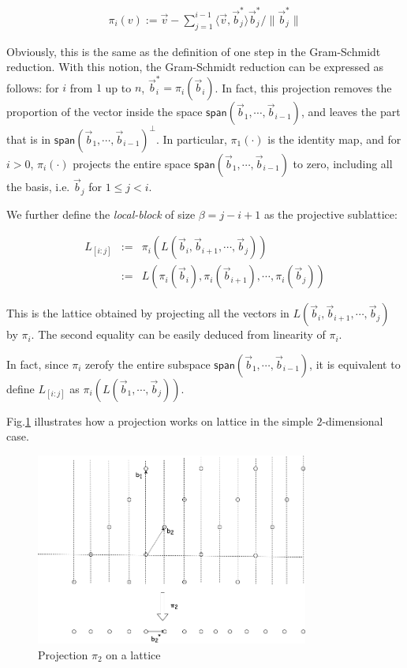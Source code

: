 \documentclass[11pt]{article}
\newcommand{\vb}{\vec{b}}
\newcommand{\sspan}{\mathsf{span}}
\begin{document}
\begin{eqnarray}
\pi_i(v):=\vec{v}-\sum_{j=1}^{i-1}\langle\vec{v},\vb_j^*\rangle\vb_j^*/\|\vb_j^*\| \label{eqn:pi}
\end{eqnarray}

Obviously, this is the same as the definition of one step in the Gram-Schmidt reduction.
With this notion, the Gram-Schmidt reduction can be expressed as follows: for $i$ from $1$ up to $n$, $\vb_i^* = \pi_i(\vb_i)$.
In fact, this projection removes the proportion of the vector inside the space $\sspan(\vb_1,\cdots,\vb_{i-1})$, and leaves the part that is in $\sspan(\vb_1,\cdots,\vb_{i-1})^{\perp}$.
In particular, $\pi_1(\cdot)$ is the identity map, and for $i>0$, $\pi_i(\cdot)$ projects the entire space $\sspan(\vb_1,\cdots,\vb_{i-1})$ to zero, including all the basis, i.e. $\vb_{j}$ for $1\leq j<i$.

We further define the \emph{local-block} of size $\beta=j-i+1$ as the projective sublattice:

\begin{eqnarray}
L_{[i:j]} &:=& \pi_i(L(\vb_i,\vb_{i+1},\cdots,\vb_j)) \nonumber \\
&:=&L(\pi_i(\vb_i),\pi_i(\vb_{i+1}),\cdots,\pi_i(\vb_{j}))
\end{eqnarray}

This is the lattice obtained by projecting all the vectors in $L(\vb_i,\vb_{i+1},\cdots,\vb_j)$ by $\pi_i$.
The second equality can be easily deduced from linearity of $\pi_i$.

In fact, since $\pi_i$ zerofy the entire subspace $\sspan(\vb_1,\cdots,\vb_{i-1})$, it is equivalent to define $L_{[i:j]}$ as $\pi_i(L(\vb_1,\cdots,\vb_{j}))$.

Fig.\ref{fig:proj} illustrates how a projection works on lattice in the simple $2$-dimensional case.

\begin{figure}[ht!]
\includegraphics[width=0.8\textwidth]{files/BKZ-Projection.png}
\caption{Projection $\pi_2$ on a lattice}
\label{fig:proj}
\end{figure}
\end{document}
